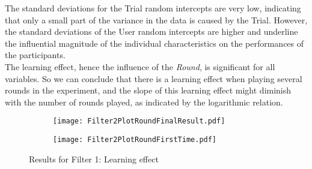The standard deviations for the Trial random intercepts are very low, indicating that only a small part of the variance in the data is caused by the Trial. However, the standard deviations of the User random intercepts are higher and underline the influential magnitude of the individual characteristics on the performances of the participants.\\
The learning effect, hence the influence of the \textit{Round}, is significant for all variables. So we can conclude that there is a learning effect when playing several rounds in the experiment, and the slope of this learning effect might diminish with the number of rounds played, as indicated by the logarithmic relation. 
\begin{figure}[H] %
\begin{center}
\begin{subfigure} 
\centering
\texttt{[image: Filter2PlotRoundFinalResult.pdf]}
\end{subfigure} 
\begin{subfigure}
\centering
\texttt{[image: Filter2PlotRoundFirstTime.pdf]}
\end{subfigure}   
  \caption[Results for Filter 1: Learning effect]{Results for Filter 1: Learning effect\footnotemark}
    \label{fig:Results for Filter 1: Learning effect} 
\end{center}
\end{figure}

\newpage

